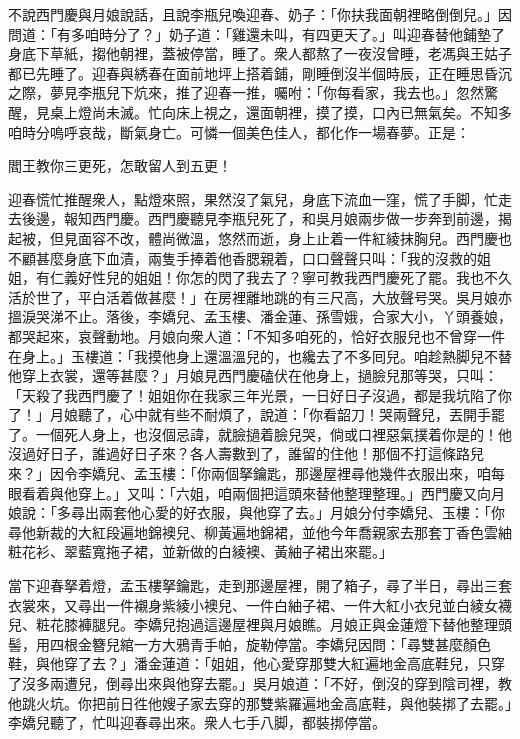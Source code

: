 不說西門慶與月娘說話，且說李瓶兒喚迎春、奶子：「你扶我面朝裡略倒倒兒。」因問道：「有多咱時分了？」奶子道：「雞還未叫，有四更天了。」叫迎春替他鋪墊了身底下草紙，搊他朝裡，蓋被停當，睡了。衆人都熬了一夜沒曾睡，老馮與王姑子都已先睡了。迎春與綉春在面前地坪上搭着鋪，剛睡倒沒半個時辰，正在睡思昏沉之際，夢見李瓶兒下炕來，推了迎春一推，囑咐：「你每看家，我去也。」忽然驚醒，見桌上燈尚未滅。忙向床上視之，還面朝裡，摸了摸，口內已無氣矣。不知多咱時分嗚呼哀哉，斷氣身亡。可憐一個美色佳人，都化作一場春夢。正是：

\begin{myquote}
閻王教你三更死，怎敢留人到五更！
\end{myquote}

迎春慌忙推醒衆人，點燈來照，果然沒了氣兒，身底下流血一窪，慌了手脚，忙走去後邊，報知西門慶。西門慶聽見李瓶兒死了，和吳月娘兩步做一步奔到前邊，揭起被，但見面容不改，體尚微溫，悠然而逝，身上止着一件紅綾抹胸兒。西門慶也不顧甚麼身底下血漬，兩隻手捧着他香腮親着，口口聲聲只叫：「我的沒救的姐姐，有仁義好性兒的姐姐！你怎的閃了我去了？寧可教我西門慶死了罷。我也不久活於世了，平白活着做甚麼！」在房裡離地跳的有三尺高，大放聲号哭。吳月娘亦搵淚哭涕不止。落後，李嬌兒、孟玉樓、潘金蓮、孫雪娥，合家大小，丫頭養娘，都哭起來，哀聲動地。月娘向衆人道：「不知多咱死的，恰好衣服兒也不曾穿一件在身上。」玉樓道：「我摸他身上還溫溫兒的，也纔去了不多囘兒。咱趁熱脚兒不替他穿上衣裳，還等甚麼？」月娘見西門慶磕伏在他身上，撾臉兒那等哭，只叫：「天殺了我西門慶了！姐姐你在我家三年光景，一日好日子沒過，{}都是我坑陷了你了！」{}月娘聽了，心中就有些不耐煩了，說道：「你看韶刀！哭兩聲兒，丟開手罷了。一個死人身上，也沒個忌諱，就臉撾着臉兒哭，倘或口裡惡氣撲着你是的！他沒過好日子，誰過好日子來？{}各人壽數到了，誰留的住他！那個不打這條路兒來？」因令李嬌兒、孟玉樓：「你兩個拏鑰匙，那邊屋裡尋他幾件衣服出來，咱每眼看着與他穿上。」又叫：「六姐，咱兩個把這頭來替他整理整理。」西門慶又向月娘說：「多尋出兩套他心愛的好衣服，與他穿了去。」月娘分付李嬌兒、玉樓：「你尋他新裁的大紅段遍地錦襖兒、柳黃遍地錦裙，並他今年喬親家去那套丁香色雲紬粧花衫、翠藍寬拖子裙，並新做的白綾襖、黃紬子裙出來罷。」

當下迎春拏着燈，孟玉樓拏鑰匙，走到那邊屋裡，開了箱子，尋了半日，尋出三套衣裳來，又尋出一件襯身紫綾小襖兒、{}一件白紬子裙、一件大紅小衣兒並白綾女襪兒、粧花膝褲腿兒。李嬌兒抱過這邊屋裡與月娘瞧。月娘正與金蓮燈下替他整理頭髻，用四根金簪兒綰一方大鴉青手帕，旋勒停當。李嬌兒因問：「尋雙甚麼顏色鞋，與他穿了去？」潘金蓮道：「姐姐，他心愛穿那雙大紅遍地金高底鞋兒，只穿了沒多兩遭兒，倒尋出來與他穿去罷。」吳月娘道：「不好，倒沒的穿到陰司裡，教他跳火坑。你把前日徃他嫂子家去穿的那雙紫羅遍地金高底鞋，與他裝挷了去罷。」李嬌兒聽了，忙叫迎春尋出來。衆人七手八脚，都裝挷停當。

